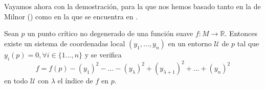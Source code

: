 Vayamos ahora con la demostración, para la que nos hemos basado tanto en la de Milnor (\cite[p.~6]{milnor1963}) como en la que se encuentra en \cite[p.~431]{marsdenHoffman1993eca}.

\begin{lemma}\label{lemamorse}
    Sean $p$ un punto crítico no degenerado de una función suave $f:M\to \mathbb{R}$. Entonces existe un sistema de coordenadas local $(y_1,\dots, y_n)$ en un entorno $\mathcal{U}$ de $p$ tal que $y_i(p)=0, \forall i\in \{1\dots,n\}$ y se verifica
    \begin{equation*}
        f=f(p)-(y_1)^2-\dots-(y_\lambda)^2 + (y_{\lambda +1})^2+\dots + (y_n)^2
    \end{equation*}
    en todo $\mathcal{U}$ con $\lambda$ el índice de $f$ en $p$.
\end{lemma}
\bigskip

